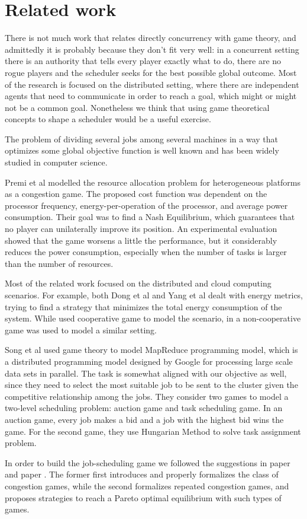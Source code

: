 \section{Related work}

There is not much work that relates directly concurrency with game theory,
and admittedly it is probably because they don't fit very well: in a concurrent
setting there is an authority that tells every player exactly what to do,
there are no rogue players and the scheduler seeks for the best possible global
outcome. Most of the research is focused on the distributed setting, where
there are independent agents that need to communicate in order to reach a 
goal, which might or might not be a common goal.
Nonetheless we think that using game theoretical concepts to shape a scheduler
would be a useful exercise.

The problem of dividing several jobs among several machines in a way 
that optimizes some global objective function is well known and has 
been widely studied in computer science. 

Premi et al \cite{9244046} modelled the resource allocation 
problem for heterogeneous platforms as a congestion game. 
The proposed cost function was dependent on the processor frequency, 
energy-per-operation of the processor, and average power consumption. 
Their goal was to find a Nash Equilibrium, which guarantees that no player 
can unilaterally improve its position. 
An experimental evaluation showed that the game worsens a little the performance, 
but it considerably reduces the power consumption, 
especially when the number of tasks is larger than the number of resources. 

Most of the related work focused on the distributed and cloud computing scenarios. 
For example, both Dong et al \cite{10.1145/2639108.2639128} 
and Yang et al \cite{7425237} dealt with energy metrics, 
trying to find a strategy that minimizes the total energy consumption of the system. 
While \cite{10.1145/2639108.2639128} used cooperative game to model the scenario, 
in \cite{7425237} a non-cooperative game was used to model a similar setting.

Song et al \cite{10.1007/978-1-4614-7010-6_33} used game theory to model MapReduce programming model, 
which is a distributed programming model designed by Google for processing large 
scale data sets in parallel. The task is somewhat aligned with our objective as well, 
since they need to select the most suitable job to be sent to the cluster given the 
competitive relationship among the jobs. They consider two games to model a two-level 
scheduling problem: auction game and task scheduling game. In an auction game, 
every job makes a bid and a job with the highest bid wins the game. 
For the second game, they use Hungarian Method to solve task assignment problem.

In order to build the job-scheduling game we followed the suggestions in paper \cite{rosenthal_class_1973}
and paper \cite{10.1145/1807406.1807411}. The former first introduces and properly formalizes the class of congestion
games, while the second formalizes repeated congestion games, and proposes strategies
to reach a Pareto optimal equilibrium with such types of games.
